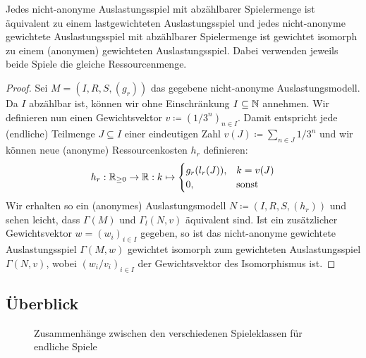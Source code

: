 \begin{satz}
	Jedes nicht-anonyme Auslastungsspiel mit abzählbarer Spielermenge ist äquivalent zu einem lastgewichteten Auslastungsspiel und jedes nicht-anonyme gewichtete Auslastungsspiel mit abzählbarer Spielermenge ist gewichtet isomorph zu einem (anonymen) gewichteten Auslastungsspiel. Dabei verwenden jeweils beide Spiele die gleiche Ressourcenmenge.
\end{satz}

\begin{proof}
	Sei $M = (I, R, S, (g_r))$ das gegebene nicht-anonyme Auslastungsmodell. Da $I$ abzählbar ist, können wir ohne Einschränkung $I \subseteq \mathbb{N}$ annehmen. Wir definieren nun einen Gewichtsvektor $v \coloneqq (1/3^n)_{n \in I}$. Damit entspricht jede (endliche) Teilmenge $J \subseteq I$ einer eindeutigen Zahl $v(J) \coloneqq \sum_{n \in J} 1/3^n$ und wir können neue (anonyme) Ressourcenkosten $h_r$ definieren:
	\[h_r: \mathbb{R}_{\geq 0} \to \mathbb{R}: k \mapsto \begin{cases}
	g_r(l_r(J)), 	&k = v(J) \\
	0,				&\text{sonst}
	\end{cases} \]
	Wir erhalten so ein (anonymes) Auslastungsmodell $N \coloneqq (I, R, S, (h_r))$ und sehen leicht, dass $\Gamma(M)$ und $\Gamma_l(N, v)$ äquivalent sind. Ist ein zusätzlicher Gewichtsvektor $w = (w_i)_{i\in I}$ gegeben, so ist das nicht-anonyme gewichtete Auslastungsspiel $\Gamma(M, w)$ gewichtet isomorph zum gewichteten Auslastungsspiel $\Gamma(N, v)$, wobei $(w_i/v_i)_{i \in I}$ der Gewichtsvektor des Isomorphismus ist.
\end{proof}


\subsection{Überblick}

\begin{figure}[h]\centering\graphicspath{{../Bilder/}}
	\resizebox{.9\textwidth}{!}{}
	\caption{Zusammenhänge zwischen den verschiedenen Spieleklassen für endliche Spiele \\}
\end{figure}